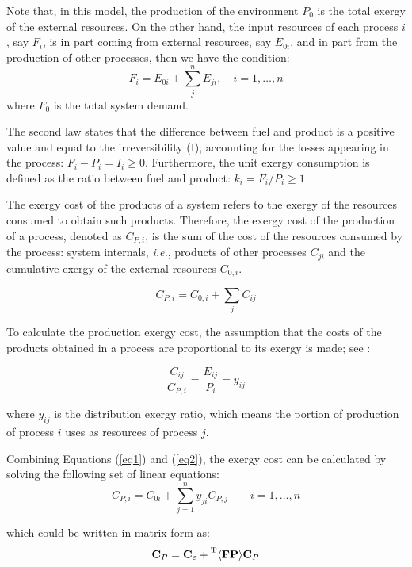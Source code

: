 \documentclass[sustainability,article,accept,moreauthors,pdftex,12pt,a4paper]{mdpi}
\newcommand{\tmbr}[1]{\ensuremath{\prescript{\mathrm{T}}{}{\langle \textbf{#1} \rangle}}}
\newcommand{\vm}[1]{\ensuremath{\mathbf{#1}}}
\begin{document}
Note that, in this model, the production of the environment $P_0$ is the total exergy of the external resources. On the other hand, the input resources of each process $i$, say $F_i$, is in
part coming from external resources, say $E_{0i}$, and in part from the
production of other processes, then we have the condition:
\begin{equation}
\label{eq:P}
F_i=E_{0i}+\sum_{j}^{n}E_{ji}, \quad i=1,\ldots,n
\end{equation}
\noindent where $F_0$ is the total system demand.


The second law states that the difference between fuel and product is a positive 
value and equal to the irreversibility (I), accounting for the losses 
appearing in the process: $F_i - P_i = I_i \geq 0$. Furthermore, the unit 
exergy consumption is defined as the ratio between fuel and product: 
$k_i={F_i}/{P_i} \geq 1$

The exergy cost of the products of a system refers to the exergy of the resources consumed to obtain such products. Therefore, the exergy cost of the production of a process, denoted as $C_{P,i}$, is the sum of the cost of the resources consumed by the process: system internals, \textit{i.e.}, products of other processes $C_{ji}$ and the cumulative exergy of the external resources $C_{0,i}$.

\begin{equation}
 C_{P,i}=C_{0,i}+\sum_{j}C_{ij}
 \label{eq1}
\end{equation}

To calculate the production exergy cost, the assumption that the costs of the products obtained in a process are proportional to its exergy is made; see \cite{Lozano1993}:

\begin{equation}
\frac{C_{ij}}{C_{P,i}}=\frac{E_{ij}}{P_i}=y_{ij}
\label{eq2}
\end{equation}

\noindent where $y_{ij}$ is the distribution exergy ratio, which means the portion of production of process $i$ uses as resources of process $j$.

Combining Equations (\ref{eq1}) and (\ref{eq2}), the exergy cost can be calculated by solving the following set of linear equations:
\begin{equation}
C_{P,i}=C_{0i}+\sum_{j=1}^{n}{y_{ji}C_{P,j}} \qquad i=1, ..., n
\end{equation}

\noindent which could be written in matrix form as:
\begin{equation}
\vm{C}_P = \vm{C}_e + \tmbr{FP} \vm{C}_P
\end{equation}
\end{document}
